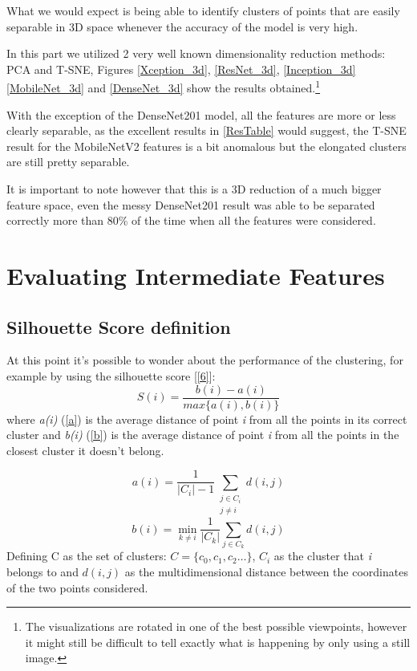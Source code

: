 \documentclass[conference]{IEEEtran}
\begin{document}
What we would expect is being able to identify clusters of points that are easily separable in 3D space whenever the accuracy of the model is very high.

In this part we utilized 2 very well known dimensionality reduction methods: PCA and T-SNE, Figures \ref{Xception_3d}, \ref{ResNet_3d}, \ref{Inception_3d} \ref{MobileNet_3d} and \ref{DenseNet_3d} show the results obtained.\footnote{The visualizations are rotated in one of the best possible viewpoints, however it might still be difficult to tell exactly what is happening by only using a still image.}

With the exception of the DenseNet201 model, all the features are more or less clearly separable, as the excellent results in \ref{ResTable} would suggest, the T-SNE result for the MobileNetV2 features is a bit anomalous but the elongated clusters are still pretty separable.

It is important to note however that this is a 3D reduction of a much bigger feature space, even the messy DenseNet201 result was able to be separated correctly more than 80\% of the time when all the features were considered.

\section{Evaluating Intermediate Features}
\subsection{Silhouette Score definition}
At this point it's possible to wonder about the performance of the clustering, for example by using the silhouette score [\ref{6}]:
\begin{equation}
S(i) = \frac{b(i) - a(i)}{max\{a(i),b(i)\}}
\label{sil}
\end{equation}
where \emph{a(i)} (\ref{a}) is the average distance of point \emph{i} from all the points in its correct cluster
and \emph{b(i)} (\ref{b}) is the average distance of point \emph{i} from all the points in the closest cluster it doesn't belong.

\begin{equation}
a(i) =\frac{1}{|C_{i}| - 1} \sum_{\substack{
   j \in C_{i} \\
   j \neq i
  }} d(i,j)
\label{a}
\end{equation}
\begin{equation}
b(i) = \min_{k \neq i} \frac{1}{|C_{k}|} \sum_{j \in C_{k}} d(i,j)
\label{b}
\end{equation}
Defining C as the set of clusters: $C = \{{c_{0},c_{1},c_{2} \dots}\}$, $C_{i}$ as the cluster that \emph{i} belongs to 
and $d(i,j)$ as the multidimensional distance between the coordinates of the two points considered.
\end{document}
